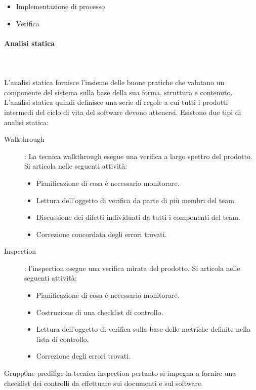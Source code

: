 \documentclass[../norme-di-progetto.tex]{subfiles}
\begin{document}
\begin{itemize}
  \item Implementazione di processo
  \item Verifica
\end{itemize}

\paragraph{Analisi statica}\mbox{}\\
\label{par:analisi statica}
\\L'analisi statica fornisce l'insieme delle buone pratiche che valutano un componente del sistema sulla base della sua forma, struttura e contenuto. L'analisi statica quindi definisce una serie di regole  a cui tutti i prodotti intermedi del ciclo di vita del software devono attenersi. Esistono due tipi di analisi statica:
\begin{description}
  \item [Walkthrough]: La tecnica walkthrough esegue una verifica a largo spettro del prodotto. Si articola nelle seguenti attività:
  \begin{itemize}
    \item Pianificazione di cosa è necessario monitorare.
    \item Lettura dell'oggetto di verifica da parte di più membri del team.
    \item Discussione dei difetti individuati da tutti i componenti del team.
    \item Correzione concordata degli errori trovati.
  \end{itemize}
  \item [Inspection]: l'inspection esegue una verifica mirata del prodotto. Si articola nelle seguenti attività:
  \begin{itemize}
    \item Pianificazione di cosa è necessario monitorare.
    \item Costruzione di una checklist di controllo.
    \item Lettura dell'oggetto di verifica sulla base delle metriche definite nella lista di controllo.
    \item Correzione degli errori trovati.
  \end{itemize}
\end{description}
Grupp0ne predilige la tecnica inspection pertanto si impegna a fornire una checklist dei controlli da effettuare sui documenti e sul software.
\end{document}
